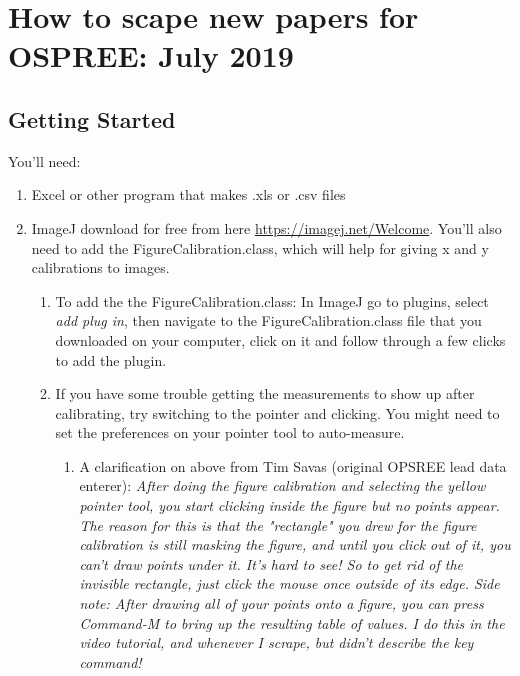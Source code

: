 \documentclass{article}\usepackage[]{graphicx}\usepackage[]{color}
\begin{document}
\section*{How to scape new papers for OSPREE: July 2019}
\subsection*{Getting Started}
You'll need:
\begin{enumerate}
\item Excel or other program that makes .xls  or .csv files
\item ImageJ download for free from here \url{https://imagej.net/Welcome}. You'll also need to add the Figure\textunderscore Calibration.class, which will help for giving x and y calibrations to images. 
\begin{enumerate}
\item To add the the Figure\textunderscore Calibration.class: In ImageJ go to plugins, select \textit{add plug in}, then navigate to the Figure\textunderscore Calibration.class file that you downloaded on your computer, click on it and follow through a few clicks to add the plugin.
\item If you have some trouble getting the measurements to show up after calibrating, try switching to the pointer and clicking. You might need to set the preferences on your pointer tool to auto-measure.
\begin{enumerate}
\item A clarification on above from Tim Savas (original OPSREE lead data enterer): \textit{After doing the figure calibration and selecting the yellow pointer tool, you start clicking inside the figure but no points appear. The reason for this is that the "rectangle" you drew for the figure calibration is still masking the figure, and until you click out of it, you can't draw points under it. It's hard to see! So to get rid of the invisible rectangle, just click the mouse once outside of its edge. Side note: After drawing all of your points onto a figure, you can press Command-M to bring up the resulting table of values. I do this in the video tutorial, and whenever I scrape, but didn't describe the key command!}
\end{enumerate}
\end{enumerate}
\end{enumerate}
\end{document}
